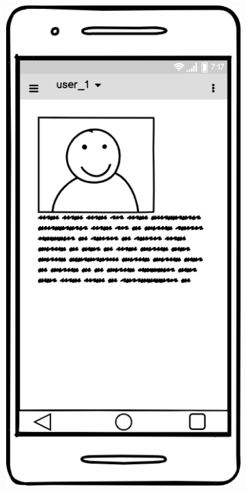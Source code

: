 \documentclass{article}
\begin{document}
\begin{figure}[!htb]
    \begin{subfigure}{0.3\textwidth}
        \includegraphics[width=\linewidth]{figs/user_1.png}

\end{subfigure}
\end{figure}
\end{document}
